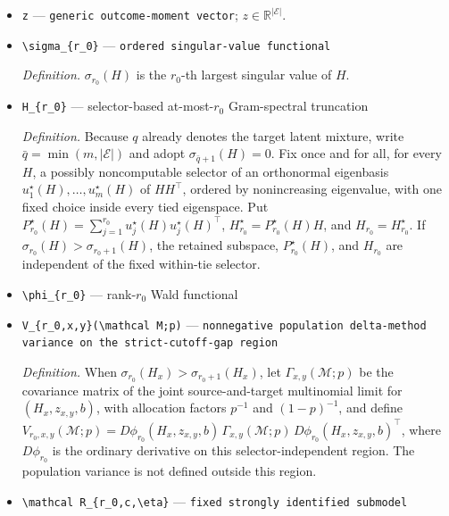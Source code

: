 \documentclass{article}
\begin{document}
\begin{itemize}
  \item \texttt{z} --- \texttt{generic outcome-\allowbreak{}moment vector}; \(z\in\mathbb R^{\lvert\mathcal E\rvert}\).
  \item \texttt{\textbackslash{}\allowbreak{}sigma\_\allowbreak{}\{r\_\allowbreak{}0\}\allowbreak{}} --- \texttt{ordered singular-\allowbreak{}value functional}
  \par\smallskip\noindent\emph{Definition.} \(\sigma_{r_0}(H)\) is the \(r_0\)-th largest singular value of \(H\).
  \item \texttt{H\_\allowbreak{}\{r\_\allowbreak{}0\}\allowbreak{}} --- selector-based at-most-\(r_0\) Gram-spectral truncation
  \par\smallskip\noindent\emph{Definition.} Because \(q\) already denotes the target latent mixture, write \(\bar q=\min(m,\lvert\mathcal E\rvert)\) and adopt \(\sigma_{\bar q+1}(H)=0\). Fix once and for all, for every \(H\), a possibly noncomputable selector of an orthonormal eigenbasis \(u_1^{\star}(H),\ldots,u_m^{\star}(H)\) of \(HH^{\top}\), ordered by nonincreasing eigenvalue, with one fixed choice inside every tied eigenspace. Put \(P_{r_0}^{\star}(H)=\sum_{j=1}^{r_0}u_j^{\star}(H)u_j^{\star}(H)^{\top}\), \(H_{r_0}^{\star}=P_{r_0}^{\star}(H)H\), and \(H_{r_0}=H_{r_0}^{\star}\). If \(\sigma_{r_0}(H)>\sigma_{r_0+1}(H)\), the retained subspace, \(P_{r_0}^{\star}(H)\), and \(H_{r_0}\) are independent of the fixed within-tie selector.
  \item \texttt{\textbackslash{}\allowbreak{}phi\_\allowbreak{}\{r\_\allowbreak{}0\}\allowbreak{}} --- rank-\(r_0\) Wald functional
  \item \texttt{V\_\allowbreak{}\{r\_\allowbreak{}0,\allowbreak{}x,\allowbreak{}y\}\allowbreak{}(\textbackslash{}\allowbreak{}mathcal M;\allowbreak{}p)} --- \texttt{nonnegative population delta-\allowbreak{}method variance on the strict-\allowbreak{}cutoff-\allowbreak{}gap region}
  \par\smallskip\noindent\emph{Definition.} When \(\sigma_{r_0}(H_x)>\sigma_{r_0+1}(H_x)\), let \(\Gamma_{x,y}(\mathcal M;p)\) be the covariance matrix of the joint source-and-target multinomial limit for \((H_x,z_{x,y},b)\), with allocation factors \(p^{-1}\) and \((1-p)^{-1}\), and define \(V_{r_0,x,y}(\mathcal M;p)=D\phi_{r_0}(H_x,z_{x,y},b)\,\Gamma_{x,y}(\mathcal M;p)\,D\phi_{r_0}(H_x,z_{x,y},b)^{\top}\), where \(D\phi_{r_0}\) is the ordinary derivative on this selector-independent region. The population variance is not defined outside this region.
  \item \texttt{\textbackslash{}\allowbreak{}mathcal R\_\allowbreak{}\{r\_\allowbreak{}0,\allowbreak{}c,\allowbreak{}\textbackslash{}\allowbreak{}eta\}\allowbreak{}} --- \texttt{fixed strongly identified submodel}

\end{itemize}
\end{document}
